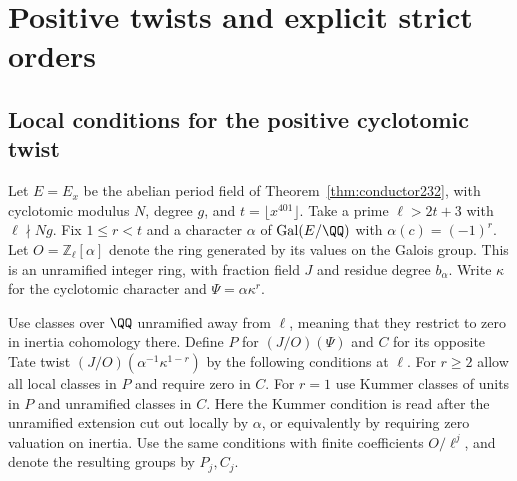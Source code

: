 \documentclass[a4paper,11pt]{article}
\theoremstyle{definition}
\theoremstyle{remark}
\newcommand{\ZZ}{\mathbb Z}\newcommand{\ord}{\operatorname{ord}}
\numberwithin{equation}{section}
\begin{document}
\section{Positive twists and explicit strict orders}\label{nav:g-III-4}

\subsection{Local conditions for the positive cyclotomic twist}\label{nav:II-71}
Let \(E=E_x\) be the abelian period field of
Theorem~\ref{thm:conductor232}, with cyclotomic modulus \(N\),
degree \(g\), and \(t=\lfloor x^{401}\rfloor\).
Take a prime \(\ell>2t+3\) with \(\ell\nmid Ng\).
Fix \(1\le r<t\) and a character \(\alpha\) of
\(\operatorname{Gal}(E/\QQ)\) with \(\alpha(c)=(-1)^r\).
Let \(O=\ZZ_\ell[\alpha]\) denote the ring generated by its
values on the Galois group. This is an unramified integer ring,
with fraction field \(J\) and residue degree \(b_\alpha\).
Write \(\kappa\) for the cyclotomic character and
\(\Psi=\alpha\kappa^r\).

Use classes over \(\QQ\) unramified away from \(\ell\), meaning
that they restrict to zero in inertia cohomology there.
Define \(P\) for \((J/O)(\Psi)\) and \(C\) for its opposite
Tate twist \((J/O)(\alpha^{-1}\kappa^{1-r})\) by the following
conditions at \(\ell\). For \(r\ge2\) allow all local classes
in \(P\) and require zero in \(C\). For \(r=1\) use Kummer
classes of units in \(P\) and unramified classes in \(C\).
Here the Kummer condition is read after the unramified extension
cut out locally by \(\alpha\), or equivalently by requiring
zero valuation on inertia. Use the same conditions with finite
coefficients \(O/\ell^j\), and denote the resulting groups by
\(P_j,C_j\).
\end{document}

